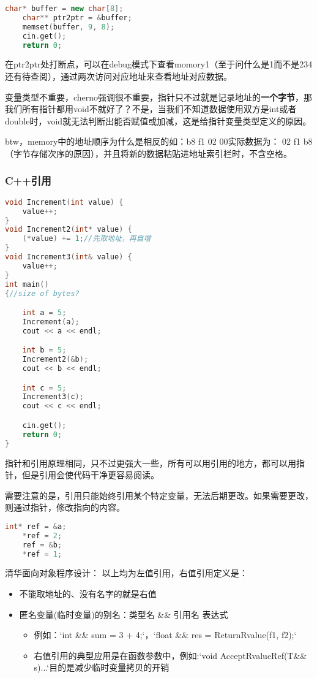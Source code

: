 \begin{lstlisting}[language=c++]
    char* buffer = new char[8];
    char** ptr2ptr = &buffer;
    memset(buffer, 9, 8);
    cin.get();
    return 0;
\end{lstlisting}

在ptr2ptr处打断点，可以在debug模式下查看momory1（至于问什么是1而不是234还有待查阅），通过两次访问对应地址来查看地址对应数据。

变量类型不重要，cherno强调很不重要，指针只不过就是记录地址的\textbf{一个字节}，那我们所有指针都用{\ncodestyle void}不就好了？不是，当我们不知道数据使用双方是int或者double时，void就无法判断出能否赋值或加减，这是给指针变量类型定义的原因。

btw，memory中的地址顺序为什么是相反的如：{\ncodestyle b8 f1 02 00}实际数据为：{ 02 f1 b8}（字节存储次序的原因），并且将新的数据粘贴进地址索引栏时，不含空格。

\subsubsection{C++引用}

\begin{lstlisting}[language=c++]
void Increment(int value) {
    value++;
}
void Increment2(int* value) {
    (*value) += 1;//先取地址，再自增
}
void Increment3(int& value) {
    value++;
}
int main()
{//size of bytes?

    int a = 5;
    Increment(a);
    cout << a << endl;

    int b = 5;
    Increment2(&b);
    cout << b << endl;

    int c = 5;
    Increment3(c);
    cout << c << endl;

    cin.get();
    return 0;
}
\end{lstlisting}

指针和引用原理相同，只不过更强大一些，所有可以用引用的地方，都可以用指针，但是引用会使代码干净更容易阅读。

需要注意的是，引用只能始终引用某个特定变量，无法后期更改。如果需要更改，则通过指针，修改指向的内容。

\begin{lstlisting}[language=c++]
    int* ref = &a;
    *ref = 2;
    ref = &b;
    *ref = 1;
\end{lstlisting}

清华面向对象程序设计：
以上均为左值引用，右值引用定义是：
\begin{itemize}
    \item 不能取地址的、没有名字的就是右值
    \item 匿名变量(临时变量)的别名：类型名 \&\& 引用名 表达式
    \begin{itemize}
        \item 例如：`int \&\& sum = 3 + 4;`，`float \&\& res = ReturnRvalue(f1, f2);`
        \item 右值引用的典型应用是在函数参数中，例如:`void AcceptRvalueRef(T\&\& s){...}`目的是减少临时变量拷贝的开销
    \end{itemize}
\end{itemize}
   
